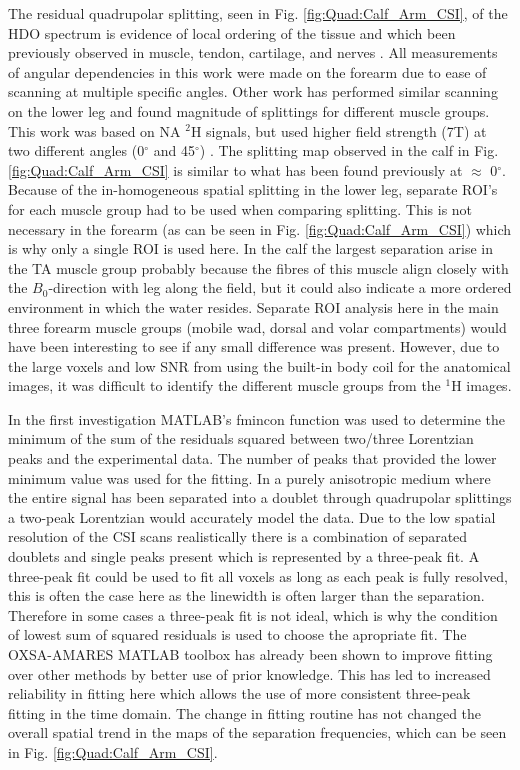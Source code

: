 The residual quadrupolar splitting, seen in Fig. \ref{fig:Quad:Calf_Arm_CSI}, of the \ac{HDO} spectrum is evidence of local ordering of the tissue and which been previously observed in muscle, tendon, cartilage, and nerves \cite{Gursan2022ResidualMuscle,Sharf1995DetectionNMR-Spectroscopy,Perea20072HDisc,Eliav2016MultipleMRS}. All measurements of angular dependencies in this work were made on the forearm due to ease of scanning at multiple specific angles. Other work has performed similar scanning on the lower leg and found magnitude of splittings for different muscle groups. This work was based on \ac{NA} $^2$H signals, but used higher field strength (7T) at two different angles (0$^\circ$ and 45$^\circ$) \cite{Gursan2022ResidualMuscle}. The splitting map observed in the calf in Fig. \ref{fig:Quad:Calf_Arm_CSI} is similar to what has been found previously at $\approx$ 0$^\circ$. Because of the in-homogeneous spatial splitting in the lower leg, separate \ac{ROI}'s for each muscle group had to be used when comparing splitting. This is not necessary in the forearm (as can be seen in Fig. \ref{fig:Quad:Calf_Arm_CSI}) which is why only a single  ROI is used here. In the calf the largest separation arise in the TA muscle group probably because the fibres of this muscle align closely \cite{Gursan2022ResidualMuscle} with the $B_0$-direction with leg along the field, but it could also indicate a more ordered environment in which the water resides. Separate \ac{ROI} analysis here in the main three forearm muscle groups (mobile wad, dorsal and volar compartments) would have been interesting to see if any small difference was present. However, due to the large voxels and low \ac{SNR} from using the built-in body coil for the anatomical images, it was difficult to identify the different muscle groups from the $^1$H images.

In the first investigation MATLAB's fmincon function was used to determine the minimum of the sum of the residuals squared between two/three Lorentzian peaks and the experimental data. The number of peaks that provided the lower minimum value was used for the fitting. In a purely anisotropic medium where the entire signal has been separated into a doublet through quadrupolar splittings a two-peak Lorentzian would accurately model the data. Due to the low spatial resolution of the \ac{CSI} scans realistically there is a combination of separated doublets and single peaks present which is represented by a three-peak fit. A three-peak fit could be used to fit all voxels as long as each peak is fully resolved, this is often the case here as the linewidth is often larger than the separation. Therefore in some cases a three-peak fit is not ideal, which is why the condition of lowest sum of squared residuals is used to choose the apropriate fit. The OXSA-AMARES MATLAB toolbox has already been shown to improve fitting over other methods by better use of prior knowledge. This has led to increased reliability in fitting here which allows the use of more consistent three-peak fitting in the time domain. The change in fitting routine has not changed the overall spatial trend in the maps of the separation frequencies, which can be seen in Fig. \ref{fig:Quad:Calf_Arm_CSI}.

